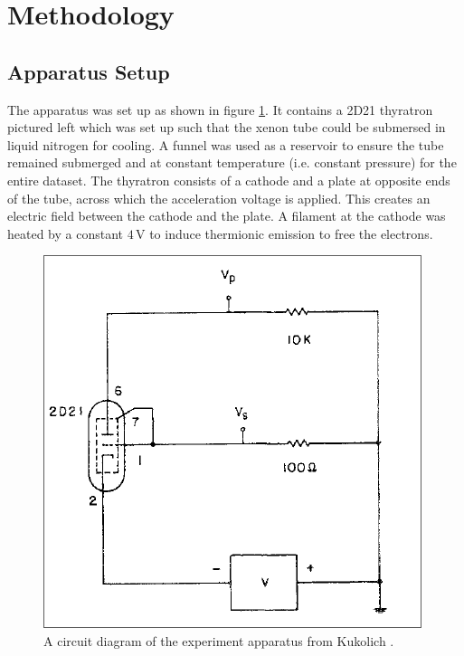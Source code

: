 \documentclass[%
reprint,
amsmath,amssymb,
aps,
floatfix
]{revtex4-2}
\begin{document}
	\section{Methodology}
	\subsection{Apparatus Setup}
	The apparatus was set up as shown in figure \ref{fig:circuit}. It contains a 2D21 thyratron pictured left which was set up such that the xenon tube could be submersed in liquid nitrogen for cooling. A funnel was used as a reservoir to ensure the tube remained submerged and at constant temperature (i.e. constant pressure) for the entire dataset. The thyratron consists of a cathode and a plate at opposite ends of the tube, across which the acceleration voltage is applied. This creates an electric field between the cathode and the plate. A filament at the cathode was heated by a constant $4 \,\text{V}$ to induce thermionic emission to free the electrons. \\
	
	\begin{figure}
		\includegraphics[width=0.85\columnwidth]{ramsauerCircuit.png}
		\caption{\label{fig:circuit}A circuit diagram of the experiment apparatus from Kukolich \cite{kukolich}.}
	\end{figure}
	
\end{document}

